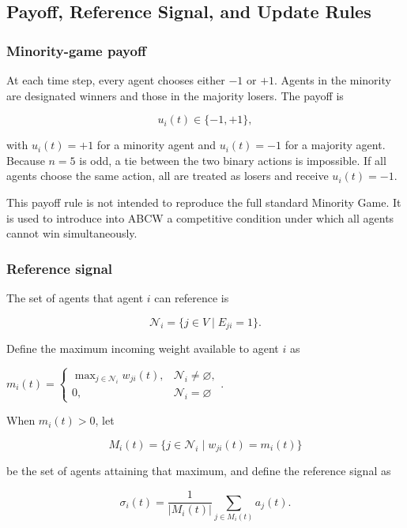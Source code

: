 \documentclass[
  11pt,
]{article}
\begin{document}
\hypertarget{payoff-reference-signal-and-update-rules}{%
\subsection{Payoff, Reference Signal, and Update
Rules}\label{payoff-reference-signal-and-update-rules}}

\subsubsection{Minority-game payoff}\label{minority-game-payoff}

At each time step, every agent chooses either \({-1}\) or \({+1}\).
Agents in the minority are designated winners and those in the majority
losers. The payoff is

\[{u_i(t)\in\lbrace-1,+1\rbrace,}\]

with \({u_i(t)=+1}\) for a minority agent and \({u_i(t)=-1}\) for a
majority agent. Because \({n=5}\) is odd, a tie between the two binary
actions is impossible. If all agents choose the same action, all are
treated as losers and receive \({u_i(t)=-1}\).

This payoff rule is not intended to reproduce the full standard Minority
Game. It is used to introduce into ABCW a competitive condition under
which all agents cannot win simultaneously.

\subsubsection{Reference signal}\label{reference-signal}

The set of agents that agent \({i}\) can reference is

\[{\mathcal N_i=\lbrace j\in V\mid E_{ji}=1\rbrace.}\]

Define the maximum incoming weight available to agent \({i}\) as

\({m_i(t)= \begin{cases} \max_{j\in\mathcal N_i}w_{ji}(t),&\mathcal N_i\neq\varnothing,\\ 0,&\mathcal N_i=\varnothing \end{cases}.}\)

When \({m_i(t)>0}\), let

\[{M_i(t)=\lbrace j\in\mathcal N_i\mid w_{ji}(t)=m_i(t)\rbrace}\]

be the set of agents attaining that maximum, and define the reference
signal as

\[{\sigma_i(t)=\frac{1}{|M_i(t)|}\sum_{j\in M_i(t)}a_j(t).}\]
\end{document}

